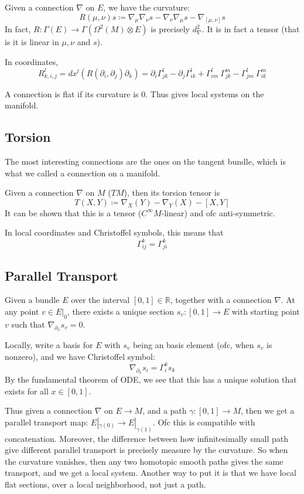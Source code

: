 \documentclass[main.tex]{subfiles}
\begin{document}
\begin{definition}
Given a connection $\nabla$ on $E$, we have the curvature:
$$
R(\mu, \nu) s  \coloneqq \nabla_{\mu} \nabla_{\nu} s - \nabla_{\nu} \nabla_{\mu} s  - \nabla_{[\mu, \nu]} s
$$
In fact, $R: \Gamma(E) \rightarrow \Gamma(\Omega^2(M) \otimes E)$ is precisely $d_\nabla ^2$. It is in fact a tensor (that is it is linear in $\mu, \nu$ and $s$).

In coordinates, 
$$
R^l _{k, i, j} = dx^l (R(\partial_i, \partial_j) \partial_k) = \partial_i \Gamma_{jk}^l - \partial_j \Gamma_{ik}^l + \Gamma_{im}^l \ \Gamma_{jk}^m   -  \Gamma_{jm}^l \  \Gamma_{ik}^m 
$$



A connection is flat if its curvature is 0. Thus gives local systems on the manifold.
\end{definition}


\subsection{Torsion}
The most interesting connections are the ones on the tangent bundle, which is what we called a connection on a manifold.

\begin{definition}Given a connection $\nabla$ on $M$ ($TM$), then its torsion tensor is 
$$
T(X,Y) \coloneqq \nabla_X(Y) - \nabla_Y(X) - [X,Y]
$$
It can be shown that this is a tensor ($C^{\infty}M$-linear) and ofc anti-symmetric.
\end{definition}

In local coordinates and Christoffel symbols, this means that 
$$
\Gamma_{ij}^k = \Gamma_{ji}^k
$$
\subsection{Parallel Transport}
Given a bundle $E$ over the interval $[0,1] \in \mathbb{R}$, together with a connection $\nabla$. At any point $v \in E|_0$, there exists a unique section $s_v : [0,1] \rightarrow E$ with starting point $v$ such that $\nabla_{\partial_x} s_v = 0$.

Locally, write a basis for $E$ with $s_v$ being an basis element (ofc, when $s_v$ is nonzero), and we have Christoffel symbol:
$$
\nabla_{\partial_x} s_i = \Gamma_{i}^k s_k
$$
By the fundamental theorem of ODE, we see that this has a unique solution that exists for all $x \in [0,1]$.

Thus given a connection $\nabla$ on $E \rightarrow M$, and a path $\gamma: [0,1] \rightarrow M$, then we get a parallel transport map: $E|_{\gamma(0)} \rightarrow E|_{\gamma(1)} $. Ofc this is compatible with concatenation. Moreover, the difference between how infinitesimally small path give different parallel transport is precisely measure by the curvature. So when the curvature vanishes, then any two homotopic smooth paths gives the same transport, and we get a local system. Another way to put it is that we have local flat sections, over a local neighborhood, not just a path.
\end{document}
